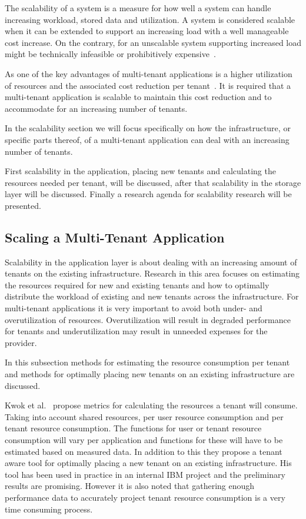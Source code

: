 The scalability of a system is a measure for how well a system can handle increasing workload, stored data and utilization.
A system is considered scalable when it can be extended to support an increasing load with a well manageable cost increase.
On the contrary, for an unscalable system supporting increased load might be technically infeasible or prohibitively expensive~\cite{bondi2000scalability}.

As one of the key advantages of multi-tenant applications is a higher utilization of resources and the associated cost reduction per tenant~\cite{bezemer2010multi}.
It is required that a multi-tenant application is scalable to maintain this cost reduction and to accommodate for an increasing number of tenants.

In the scalability section we will focus specifically on how the infrastructure, or specific parts thereof, of a multi-tenant application can deal with an increasing number of tenants.

First scalability in the application, placing new tenants and calculating the resources needed per tenant, will be discussed, after that scalability in the storage layer will be discussed. 
Finally a research agenda for scalability research will be presented.

\subsection{Scaling a Multi-Tenant Application}
\label{sec:scal_mta}
Scalability in the application layer is about dealing with an increasing amount of tenants on the existing infrastructure.
Research in this area focuses on estimating the resources required for new and existing tenants and how to optimally distribute the workload of existing and new tenants across the infrastructure. 
For multi-tenant applications it is very important to avoid both under- and overutilization of resources.
Overutilization will result in degraded performance for tenants and underutilization may result in unneeded expenses for the provider.

In this subsection methods for estimating the resource consumption per tenant and methods for optimally placing new tenants on an existing infrastructure are discussed.

Kwok et al.~\cite{kwok2008resource} propose metrics for calculating the resources a tenant will consume.
Taking into account shared resources, per user resource consumption and per tenant resource consumption.
The functions for user or tenant resource consumption will vary per application and functions for these will have to be estimated based on measured data.
In addition to this they propose a tenant aware tool for optimally placing a new tenant on an existing infrastructure.
His tool has been used in practice in an internal IBM project and the preliminary results are promising. 
However it is also noted that gathering enough performance data to accurately project tenant resource consumption is a very time consuming process.

